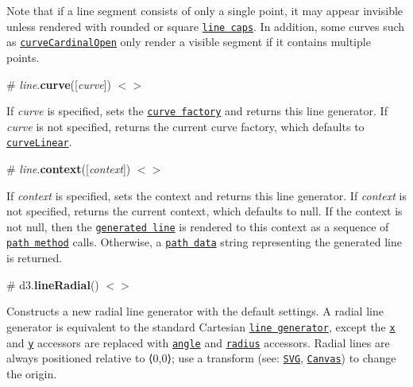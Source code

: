 \href{http://bl.ocks.org/mbostock/0533f44f2cfabecc5e3a}{\tt }

Note that if a line segment consists of only a single point, it may appear invisible unless rendered with rounded or square \href{https://developer.mozilla.org/en-US/docs/Web/SVG/Attribute/stroke-linecap}{\tt line caps}. In addition, some curves such as \href{#curveCardinalOpen}{\tt curve\+Cardinal\+Open} only render a visible segment if it contains multiple points.

\label{_line_curve}%
\# {\itshape line}.{\bfseries curve}(\mbox{[}{\itshape curve}\mbox{]}) \href{https://github.com/d3/d3-shape/blob/master/src/line.js#L46}{\tt $<$$>$}

If {\itshape curve} is specified, sets the \href{#curves}{\tt curve factory} and returns this line generator. If {\itshape curve} is not specified, returns the current curve factory, which defaults to \href{#curveLinear}{\tt curve\+Linear}.

\label{_line_context}%
\# {\itshape line}.{\bfseries context}(\mbox{[}{\itshape context}\mbox{]}) \href{https://github.com/d3/d3-shape/blob/master/src/line.js#L50}{\tt $<$$>$}

If {\itshape context} is specified, sets the context and returns this line generator. If {\itshape context} is not specified, returns the current context, which defaults to null. If the context is not null, then the \href{#_line}{\tt generated line} is rendered to this context as a sequence of \href{http://www.w3.org/TR/2dcontext/#canvaspathmethods}{\tt path method} calls. Otherwise, a \href{http://www.w3.org/TR/SVG/paths.html#PathData}{\tt path data} string representing the generated line is returned.

\label{_lineRadial}%
\# d3.{\bfseries line\+Radial}() \href{https://github.com/d3/d3-shape/blob/master/src/lineRadial.js}{\tt $<$$>$}



Constructs a new radial line generator with the default settings. A radial line generator is equivalent to the standard Cartesian \href{#line}{\tt line generator}, except the \href{#line_x}{\tt x} and \href{#line_y}{\tt y} accessors are replaced with \href{#lineRadial_angle}{\tt angle} and \href{#lineRadial_radius}{\tt radius} accessors. Radial lines are always positioned relative to ⟨0,0⟩; use a transform (see\+: \href{http://www.w3.org/TR/SVG/coords.html#TransformAttribute}{\tt S\+VG}, \href{http://www.w3.org/TR/2dcontext/#transformations}{\tt Canvas}) to change the origin.

